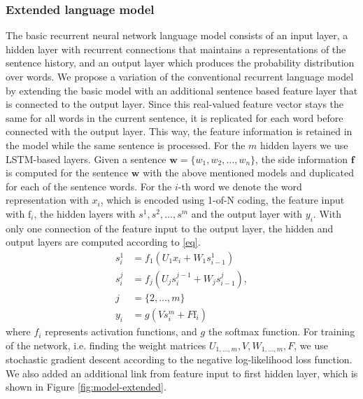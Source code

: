 \documentclass[a4paper]{article}
\begin{document}
\subsubsection{Extended language model}
The basic recurrent neural network language model consists of an input layer, a hidden layer with recurrent connections that maintains a representations of the sentence history, and an output layer which produces the probability distribution over words.
We propose a variation of the conventional recurrent language model by extending the basic model with an additional sentence based feature layer that is connected to the output layer. Since this real-valued feature vector stays the same for all words in the current sentence, it is replicated 
for each word before connected with the output layer. This way, the feature information is retained in the model while the same sentence is processed.
For the $m$ hidden layers we use LSTM-based layers. 
Given a sentence $\textbf{w} = \{w_1, w_2, \ldots, w_n\}$, the side information $\textbf{f}$ is computed for the sentence $\textbf{w}$ with the above mentioned models and duplicated for each of the sentence words. For the $i$-th word we denote the word representation with $x_i$, which is encoded using 1-of-N coding, the feature input with $\text{f}_i$, the hidden layers with $s^1, s^2, \dots, s^m$ and the output layer with $y_i$. With only one connection of the feature input to the output layer, the hidden and output layers are computed according to \eqref{eq}.
\begin{equation}
\label{eq}
\begin{aligned}
s^1_i &= f_1(U_1x_i + W_1s^1_{i-1}) \\
s^j_i &= f_j(U_js^{j-1}_i + W_js^j_{i-1}), \\j &= \{2,\ldots,m\} \\
y_i &= g(Vs^m_i + F\text{f}_i)
\end{aligned}
\end{equation}
where $f_i$ represents activation functions, and $g$ the softmax function.
For training of the network, i.e. finding the weight matrices $U_{1,\dots,m}, V, W_{1,\dots,m}, F$, we use stochastic gradient descent according to the negative log-likelihood loss function. We also added an additional link from feature input to first hidden layer, which is shown in Figure \ref{fig:model-extended}.
\end{document}
